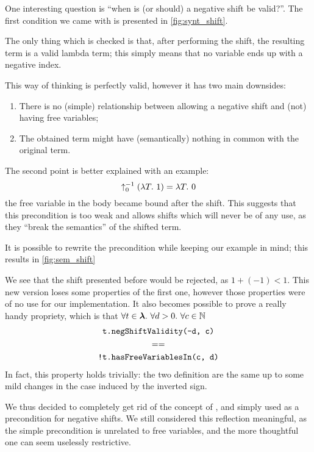 One interesting question is ``when is (or should) a negative shift be valid?''.
The first condition we came with is presented in \cref{fig:synt_shift}.

The only thing which is checked is that, after performing the shift,
the resulting term is a valid lambda term;
this simply means that no variable ends up with a negative index.

This way of thinking is perfectly valid, however it has two main downsides:
\begin{enumerate}
    \item There is no (simple) relationship between allowing a negative shift and (not) having free variables;
    \item The obtained term might have (semantically) nothing in common with the original term.
\end{enumerate}
The second point is better explained with an example:
\[{\uparrow^{-1}_{0}\left(\lambda{}{T}.\ {1}\right)} = \lambda{}{T}.\ {0}\]
the free variable in the body became bound after the shift.
This suggests that this precondition is too weak and allows shifts which will never be of any use,
as they ``break the semantics'' of the shifted term.

It is possible to rewrite the precondition while keeping our example in mind;
this results in \cref{fig:sem_shift}

We see that the shift presented before would be rejected, as $1+(-1) < 1$.
This new version loses some properties of the first one, 
however those properties were of no use for our implementation.
It also becomes possible to prove a really handy propriety,
which is that $\forall t \in\bm\lambda.\ \forall d > 0.\ \forall c \in \mathbb{N}$
\begin{gather*}
    \texttt{t.negShiftValidity(-d, c)}\\
    ==\\
    \texttt{!t.hasFreeVariablesIn(c, d)}
\end{gather*}
In fact, this property holds trivially: 
the two definition are the same up to some mild changes in the  case induced by the inverted sign.

We thus decided to completely get rid of the concept of ,
and simply used  as a precondition for negative shifts.
We still considered this reflection meaningful, as the simple precondition is unrelated to free variables, and the more thoughtful one can seem uselessly restrictive.